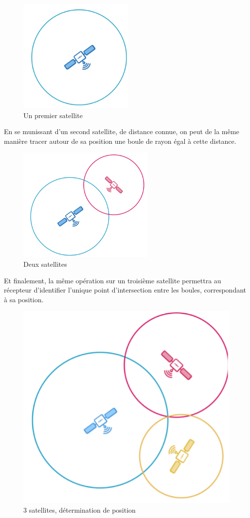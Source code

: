          \begin{figure}[h]
             \centering
             \includegraphics[width=.3\textwidth]{imgs/sat1}
             \caption{Un premier satellite}
             \label{fig:1sat}
         \end{figure}

         En se munissant d'un second satellite, de distance connue, on peut de la même manière tracer autour de sa position une boule de rayon égal à cette distance.

         \begin{figure}[h]
             \centering
             \includegraphics[width=.3\textwidth]{imgs/sat2}
             \caption{Deux satellites}
             \label{fig:2sat}
         \end{figure}

         Et finalement, la même opération sur un troisième satellite permettra au récepteur d'identifier l'unique point d'intersection entre les boules, correspondant à sa position.

         \begin{figure}[h]
             \centering
             \includegraphics[width=.3\textwidth]{imgs/sat3}
             \caption{3 satellites, détermination de position}
             \label{fig:3sat}
         \end{figure}

